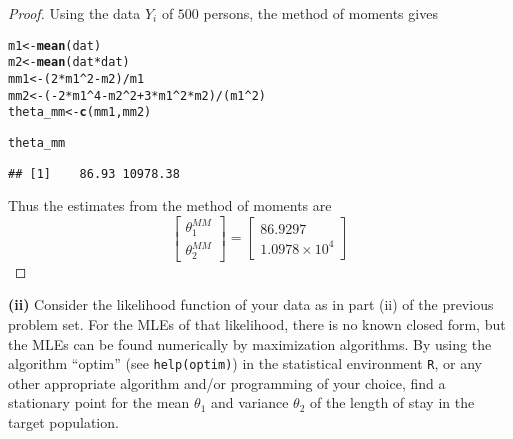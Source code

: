 \documentclass[letterpaper, 12pt]{article}\usepackage[]{graphicx}\usepackage[]{color}
\makeatletter
\newcommand{\hlnum}[1]{\textcolor[rgb]{0.686,0.059,0.569}{#1}}%
\newcommand{\hlopt}[1]{\textcolor[rgb]{0,0,0}{#1}}%
\newcommand{\hlstd}[1]{\textcolor[rgb]{0.345,0.345,0.345}{#1}}%
\newcommand{\hlkwb}[1]{\textcolor[rgb]{0.69,0.353,0.396}{#1}}%
\newcommand{\hlkwd}[1]{\textcolor[rgb]{0.737,0.353,0.396}{\textbf{#1}}}%
\newenvironment{kframe}{%
 \def\at@end@of@kframe{}%
 \ifinner\ifhmode%
  \def\at@end@of@kframe{\end{minipage}}%
  \begin{minipage}{\columnwidth}%
 \fi\fi%
 \def\FrameCommand##1{\hskip\@totalleftmargin \hskip-\fboxsep
 \colorbox{shadecolor}{##1}\hskip-\fboxsep
     \hskip-\linewidth \hskip-\@totalleftmargin \hskip\columnwidth}%
 \MakeFramed {\advance\hsize-\width
   \@totalleftmargin\z@ \linewidth\hsize
   \@setminipage}}%
 {\par\unskip\endMakeFramed%
 \at@end@of@kframe}
\newenvironment{knitrout}{}{} %
\makeatother
\begin{document}
\begin{proof}
Using the data $Y_i$ of $500$ persons, the method of moments gives
\begin{knitrout}
\color{fgcolor}\begin{kframe}
\begin{alltt}
\hlstd{m1} \hlkwb{<-} \hlkwd{mean}\hlstd{(dat)}
\hlstd{m2} \hlkwb{<-} \hlkwd{mean}\hlstd{(dat} \hlopt{*} \hlstd{dat)}
\hlstd{mm1} \hlkwb{<-} \hlstd{(}\hlnum{2} \hlopt{*} \hlstd{m1}\hlopt{^}\hlnum{2} \hlopt{-} \hlstd{m2)}\hlopt{/}\hlstd{m1}
\hlstd{mm2} \hlkwb{<-} \hlstd{(}\hlopt{-}\hlnum{2} \hlopt{*} \hlstd{m1}\hlopt{^}\hlnum{4} \hlopt{-} \hlstd{m2}\hlopt{^}\hlnum{2} \hlopt{+} \hlnum{3} \hlopt{*} \hlstd{m1}\hlopt{^}\hlnum{2} \hlopt{*} \hlstd{m2)}\hlopt{/}\hlstd{(m1}\hlopt{^}\hlnum{2}\hlstd{)}
\hlstd{theta_mm} \hlkwb{<-} \hlkwd{c}\hlstd{(mm1, mm2)}

\hlstd{theta_mm}
\end{alltt}
\begin{verbatim}
## [1]    86.93 10978.38
\end{verbatim}
\end{kframe}
\end{knitrout}

Thus the estimates from the method of moments are
\[
\begin{bmatrix}
\theta_1^{MM}
\\
\theta_2^{MM}
\end{bmatrix}
=
\begin{bmatrix}
86.9297
\\
\ensuremath{1.0978\times 10^{4}}
\end{bmatrix}
\]
\end{proof}
\textbf{(ii)}
Consider the likelihood function of your data as in
part (ii) of the previous problem set. For the MLEs of that likelihood,
there is no known closed form, but the MLEs can be found numerically by
maximization algorithms. By using the algorithm ``optim'' (see \texttt{help(optim)}) in the statistical environment
\texttt{R}, or any other appropriate algorithm
and/or programming of your choice, find a stationary point for the mean 
$\theta_{1}$ and variance $\theta_{2}$ of the length of stay in the target
population.
\end{document}
